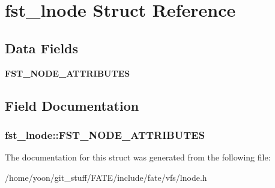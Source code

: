 \hypertarget{structfst__lnode}{\section{fst\-\_\-lnode Struct Reference}
\label{structfst__lnode}
}
\subsection*{Data Fields}
\begin{DoxyCompactItemize}
\item 
\hypertarget{structfst__lnode_a4ab2a56bdbd6183d5ccea945ff2774ac}{{\bfseries F\-S\-T\-\_\-\-N\-O\-D\-E\-\_\-\-A\-T\-T\-R\-I\-B\-U\-T\-E\-S}}\label{structfst__lnode_a4ab2a56bdbd6183d5ccea945ff2774ac}

\end{DoxyCompactItemize}


\subsection{Field Documentation}
\hypertarget{structfst__lnode_a4ab2a56bdbd6183d5ccea945ff2774ac}{
\subsubsection[{F\-S\-T\-\_\-\-N\-O\-D\-E\-\_\-\-A\-T\-T\-R\-I\-B\-U\-T\-E\-S}]{\setlength{\rightskip}{0pt plus 5cm}fst\-\_\-lnode\-::\-F\-S\-T\-\_\-\-N\-O\-D\-E\-\_\-\-A\-T\-T\-R\-I\-B\-U\-T\-E\-S}}\label{structfst__lnode_a4ab2a56bdbd6183d5ccea945ff2774ac}


The documentation for this struct was generated from the following file\-:\begin{DoxyCompactItemize}
\item 
/home/yoon/git\-\_\-stuff/\-F\-A\-T\-E/include/fate/vfs/lnode.\-h\end{DoxyCompactItemize}
